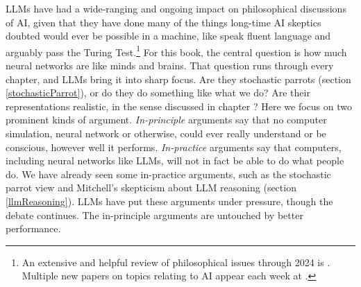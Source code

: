 LLMs have had a wide-ranging and ongoing impact on philosophical discussions of
AI, given that they have done many of the things long-time AI skeptics doubted
would ever be possible in a machine, like speak fluent language and arguably
pass the Turing Test.\footnote{An extensive and helpful review of philosophical
issues through 2024 is \cite{milliere2024philosophical1,
milliere2024philosophical2}. Multiple new papers on topics relating to AI
appear each week at .} For this book, the central
question is how much neural networks are like minds and brains. That question
runs through every chapter, and LLMs bring it into sharp focus. Are they
stochastic parrots (section \ref{stochasticParrot}), or do they do something
like what we do? Are their representations realistic, in the sense discussed in
chapter ? Here we focus on two prominent kinds of
argument. \emph{In-principle} arguments say that no computer simulation, neural
network or otherwise, could ever really understand or be conscious, however
well it performs. \emph{In-practice} arguments say that computers, including
neural networks like LLMs, will not in fact be able to do what people do. We have already seen some in-practice arguments,
such as the stochastic parrot view and Mitchell's skepticism about LLM
reasoning (section \ref{llmReasoning}). LLMs have put these arguments under
pressure, though the debate continues. The in-principle arguments are untouched
by better performance.


